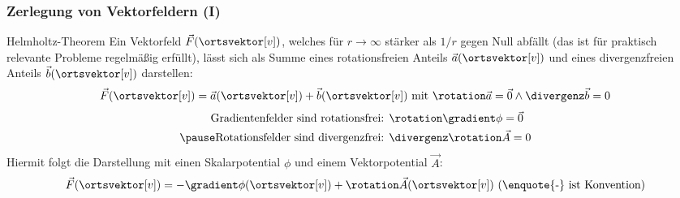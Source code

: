 \begin{frame}
  \frametitle{Zerlegung von Vektorfeldern (I)}
  \begin{block}{Helmholtz-Theorem}
    Ein Vektorfeld $\vec{F}(\ortsvektor[v])$, welches für $r\to\infty$
    stärker als $1/r$ gegen Null abfällt (das ist für praktisch
    relevante Probleme regelmäßig erfüllt), lässt sich als Summe eines
    rotationsfreien Anteils $\vec{a}(\ortsvektor[v])$ und eines
    divergenzfreien Anteils $\vec{b}(\ortsvektor[v])$ darstellen:
    $$
    \vec{F}(\ortsvektor[v]) = \vec{a}(\ortsvektor[v]) + \vec{b}(\ortsvektor[v]) \text{ mit
    } \rotation  \vec{a} = \vec{0} \land \divergenz  \vec{b} = 0 
    $$\pause
    \begin{align*}
    \text{Gradientenfelder sind rotationsfrei: } & \rotation\gradient \phi =\vec{0}\\ \pause
      \text{Rotationsfelder sind divergenzfrei: } & \divergenz\rotation \vec{A}
                                                    = 0
    \end{align*}\pause
    Hiermit folgt die Darstellung mit einen \alert{Skalarpotential}
    $\phi$ und einem \alert{Vektorpotential} $\vec{A}$:
    $$
    \vec{F}(\ortsvektor[v]) = - \gradient \phi (\ortsvektor[v]) + \rotation
    \vec{A}(\ortsvektor[v]) \text{ (\enquote{-} ist Konvention)}
    $$
  \end{block}
  \end{frame}
